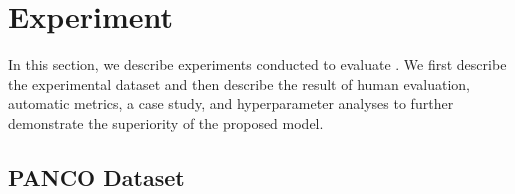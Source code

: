 \label{sec-experiment}
\section{Experiment}
In this section, we describe experiments conducted to evaluate \modelname.
We first describe the experimental dataset and then describe the result of human evaluation,
automatic metrics, a case study, and hyperparameter analyses 
to further demonstrate the superiority of the proposed model. 

\subsection{PANCO Dataset}




